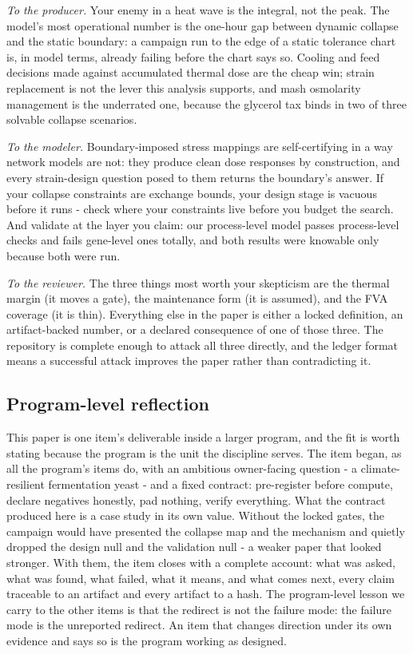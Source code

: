 \documentclass[12pt]{article}
\begin{document}
\emph{To the producer.} Your enemy in a heat wave is the integral,
not the peak. The model's most operational number is the one-hour gap
between dynamic collapse and the static boundary: a campaign run to
the edge of a static tolerance chart is, in model terms, already
failing before the chart says so. Cooling and feed decisions made
against accumulated thermal dose are the cheap win; strain
replacement is not the lever this analysis supports, and mash
osmolarity management is the underrated one, because the glycerol tax
binds in two of three solvable collapse scenarios.

\emph{To the modeler.} Boundary-imposed stress mappings are
self-certifying in a way network models are not: they produce clean
dose responses by construction, and every strain-design question
posed to them returns the boundary's answer. If your collapse
constraints are exchange bounds, your design stage is vacuous before
it runs - check where your constraints live before you budget the
search. And validate at the layer you claim: our process-level model
passes process-level checks and fails gene-level ones totally, and
both results were knowable only because both were run.

\emph{To the reviewer.} The three things most worth your skepticism
are the thermal margin (it moves a gate), the maintenance form (it is
assumed), and the FVA coverage (it is thin). Everything else in the
paper is either a locked definition, an artifact-backed number, or a
declared consequence of one of those three. The repository is
complete enough to attack all three directly, and the ledger format
means a successful attack improves the paper rather than
contradicting it.


\subsection{Program-level reflection}

This paper is one item's deliverable inside a larger program, and the
fit is worth stating because the program is the unit the discipline
serves. The item began, as all the program's items do, with an
ambitious owner-facing question - a climate-resilient fermentation
yeast - and a fixed contract: pre-register before compute, declare
negatives honestly, pad nothing, verify everything. What the contract
produced here is a case study in its own value. Without the locked
gates, the campaign would have presented the collapse map and the
mechanism and quietly dropped the design null and the validation
null - a weaker paper that looked stronger. With them, the item
closes with a complete account: what was asked, what was found, what
failed, what it means, and what comes next, every claim traceable to
an artifact and every artifact to a hash. The program-level lesson we
carry to the other items is that the redirect is not the failure
mode: the failure mode is the unreported redirect. An item that
changes direction under its own evidence and says so is the program
working as designed.
\end{document}
